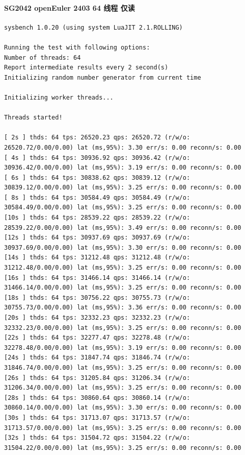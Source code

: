 \documentclass{article}
\begin{document}
\paragraph{SG2042 openEuler 2403 64 线程 仅读}

\begin{verbatim}
sysbench 1.0.20 (using system LuaJIT 2.1.ROLLING)

Running the test with following options:
Number of threads: 64
Report intermediate results every 2 second(s)
Initializing random number generator from current time

Initializing worker threads...

Threads started!

[ 2s ] thds: 64 tps: 26520.23 qps: 26520.72 (r/w/o: 26520.72/0.00/0.00) lat (ms,95%): 3.30 err/s: 0.00 reconn/s: 0.00
[ 4s ] thds: 64 tps: 30936.92 qps: 30936.42 (r/w/o: 30936.42/0.00/0.00) lat (ms,95%): 3.19 err/s: 0.00 reconn/s: 0.00
[ 6s ] thds: 64 tps: 30838.62 qps: 30839.12 (r/w/o: 30839.12/0.00/0.00) lat (ms,95%): 3.25 err/s: 0.00 reconn/s: 0.00
[ 8s ] thds: 64 tps: 30584.49 qps: 30584.49 (r/w/o: 30584.49/0.00/0.00) lat (ms,95%): 3.25 err/s: 0.00 reconn/s: 0.00
[10s ] thds: 64 tps: 28539.22 qps: 28539.22 (r/w/o: 28539.22/0.00/0.00) lat (ms,95%): 3.49 err/s: 0.00 reconn/s: 0.00
[12s ] thds: 64 tps: 30937.69 qps: 30937.69 (r/w/o: 30937.69/0.00/0.00) lat (ms,95%): 3.30 err/s: 0.00 reconn/s: 0.00
[14s ] thds: 64 tps: 31212.48 qps: 31212.48 (r/w/o: 31212.48/0.00/0.00) lat (ms,95%): 3.25 err/s: 0.00 reconn/s: 0.00
[16s ] thds: 64 tps: 31466.14 qps: 31466.14 (r/w/o: 31466.14/0.00/0.00) lat (ms,95%): 3.25 err/s: 0.00 reconn/s: 0.00
[18s ] thds: 64 tps: 30756.22 qps: 30755.73 (r/w/o: 30755.73/0.00/0.00) lat (ms,95%): 3.36 err/s: 0.00 reconn/s: 0.00
[20s ] thds: 64 tps: 32332.23 qps: 32332.23 (r/w/o: 32332.23/0.00/0.00) lat (ms,95%): 3.25 err/s: 0.00 reconn/s: 0.00
[22s ] thds: 64 tps: 32277.47 qps: 32278.48 (r/w/o: 32278.48/0.00/0.00) lat (ms,95%): 3.19 err/s: 0.00 reconn/s: 0.00
[24s ] thds: 64 tps: 31847.74 qps: 31846.74 (r/w/o: 31846.74/0.00/0.00) lat (ms,95%): 3.25 err/s: 0.00 reconn/s: 0.00
[26s ] thds: 64 tps: 31205.84 qps: 31206.34 (r/w/o: 31206.34/0.00/0.00) lat (ms,95%): 3.25 err/s: 0.00 reconn/s: 0.00
[28s ] thds: 64 tps: 30860.64 qps: 30860.14 (r/w/o: 30860.14/0.00/0.00) lat (ms,95%): 3.30 err/s: 0.00 reconn/s: 0.00
[30s ] thds: 64 tps: 31713.07 qps: 31713.57 (r/w/o: 31713.57/0.00/0.00) lat (ms,95%): 3.25 err/s: 0.00 reconn/s: 0.00
[32s ] thds: 64 tps: 31504.72 qps: 31504.22 (r/w/o: 31504.22/0.00/0.00) lat (ms,95%): 3.25 err/s: 0.00 reconn/s: 0.00

\end{verbatim}
\end{document}
